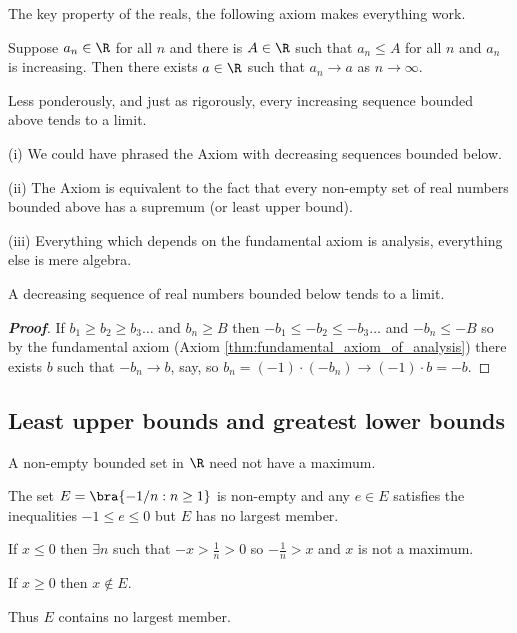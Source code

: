 The key property of the reals, the following axiom makes everything work.

\begin{theorem}\label{thm:fundamental_axiom_of_analysis}%
Suppose $a_n\in\R$ for all $n$ and there is $A\in\R$ such that $a_n\leq A$ for all $n$ and $a_n$ is increasing. Then there exists $a\in\R$ such that $a_n\to a$ as $n\to\infty$.

Less ponderously, and just as rigorously, every increasing sequence bounded above tends to a limit.
\end{theorem}

\begin{remark}
\ben
\item [(i)] We could have phrased the Axiom with decreasing sequences bounded below.
\item [(ii)] The Axiom is equivalent to the fact that every non-empty set of real numbers bounded above has a supremum (or least upper bound).
\item [(iii)] Everything which depends on the fundamental axiom is analysis, everything else is mere algebra.
\een
\end{remark}

\begin{proposition}\label{pro:decreasing_sequence_bounded_below}
A decreasing sequence of real numbers bounded below tends to a limit.
\end{proposition}

\begin{proof}[\bf Proof]
If $b_1 \geq b_2 \geq b_3 \ldots $ and $b_n \geq B$ then $-b_1 \leq -b_2 \leq -b_3 \ldots$ and $-b_n \leq -B$ so by the fundamental axiom (Axiom \ref{thm:fundamental_axiom_of_analysis}) there exists $b$ such that $-b_n \to b$, say, so $b_n = (-1)\cdot(-b_n) \to (-1)\cdot b = - b$.
\end{proof}



\subsection{Least upper bounds and greatest lower bounds}

\begin{theorem}
A non-empty bounded set in $\R$ need not have a maximum.
\end{theorem}

\begin{example}
The set $E= \bra{-1/n : n\geq 1}$ is non-empty and any $e\in E$ satisfies the inequalities $-1 \leq e \leq 0$ but $E$ has no largest member.

If $x \leq 0$ then $\exists n$ such that $-x > \frac{1}{n} > 0$ so $-\frac{1}{n} > x$ and $x$ is not a maximum.

If $x \geq 0$ then $x \notin E$.

Thus $E$ contains no largest member.
\end{example}

